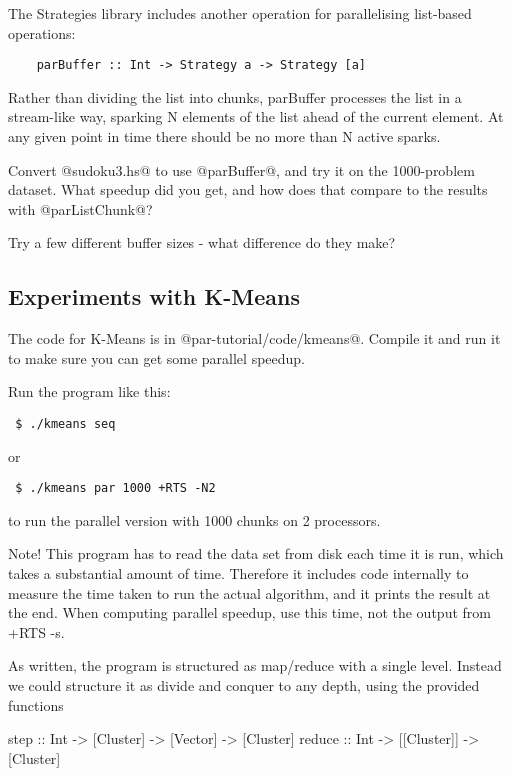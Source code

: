 \documentclass[11pt,a4paper]{article}
\begin{document}
The Strategies library includes another operation for parallelising
list-based operations:

{\small \begin{verbatim}
    parBuffer :: Int -> Strategy a -> Strategy [a]
\end{verbatim}}

Rather than dividing the list into chunks, parBuffer processes the
list in a stream-like way, sparking N elements of the list ahead of
the current element.  At any given point in time there should be no
more than N active sparks.

Convert @sudoku3.hs@ to use @parBuffer@, and try it on the
1000-problem dataset.  What speedup did you get, and how does that
compare to the results with @parListChunk@?

Try a few different buffer sizes - what difference do they make?

\subsection{Experiments with K-Means}

The code for K-Means is in @par-tutorial/code/kmeans@.  Compile it and
run it to make sure you can get some parallel speedup.

Run the program like this:

{\small \begin{verbatim}
 $ ./kmeans seq
\end{verbatim}}

or

{\small \begin{verbatim}
 $ ./kmeans par 1000 +RTS -N2
\end{verbatim}}

to run the parallel version with 1000 chunks on 2 processors.

Note!  This program has to read the data set from disk each time it is
run, which takes a substantial amount of time.  Therefore it includes
code internally to measure the time taken to run the actual algorithm,
and it prints the result at the end.  When computing parallel speedup,
use this time, not the output from +RTS -s.

As written, the program is structured as map/reduce with a single
level.  Instead we could structure it as divide and conquer to any
depth, using the provided functions

\begin{haskell}
  step   :: Int -> [Cluster] -> [Vector] -> [Cluster]
  reduce :: Int -> [[Cluster]] -> [Cluster]
\end{haskell}
\end{document}
